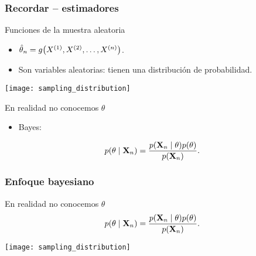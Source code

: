 \documentclass[table]{beamer}
\begin{document}
\begin{frame}
    \frametitle{Recordar -- estimadores}
    \begin{block}{Funciones de la muestra aleatoria}
        \begin{itemize}
            \item $\hat{\theta}_{n} = g \parens{X^{\parens{1}} , X^{\parens{2}} , \ldots , X^{\parens{n}}}$.
            \item Son variables aleatorias: tienen una distribución de probabilidad.
        \end{itemize}
    \end{block}
    \begin{center}
        \texttt{[image: sampling\_distribution]}
    \end{center}
    \begin{block}{En realidad no conocemos $\theta$}
        \begin{itemize}
            \item Bayes:
        \end{itemize}
        \begin{equation*}
            \pdf{\theta \mid \Xvec_{n}} = \frac{\pdf{\Xvec_{n} \mid \theta} \pdf{\theta}}{\pdf{\Xvec_{n}}} .
        \end{equation*}
    \end{block}
\end{frame}

\begin{frame}
    \frametitle{Enfoque bayesiano}
    \begin{block}{En realidad no conocemos $\theta$}
        \begin{equation*}
            \pdf{\theta \mid \Xvec_{n}} = \frac{\pdf{\Xvec_{n} \mid \theta} \pdf{\theta}}{\pdf{\Xvec_{n}}} .
        \end{equation*}
    \end{block}
    \begin{center}
        \texttt{[image: sampling\_distribution]}
    \end{center}
\end{frame}
\end{document}
